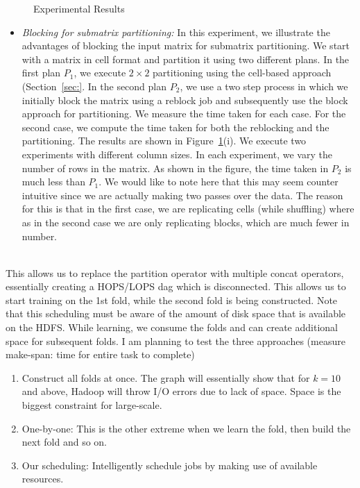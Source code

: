 \documentclass{vldb}
\newcommand{\topic}[1]{\par \smallskip \smallskip \noindent{\bf \uline{#1}}}
\begin{document}
{\begin{figure}
\begin{tabular}{ccc}
\end{tabular}

\caption{Experimental Results}
\label{fig:results}
\end{figure}

\topic{Optimization}

\begin{itemize}
\item {\em Blocking for submatrix partitioning:}
In this experiment, we illustrate the advantages of
blocking the input matrix for submatrix partitioning. We start with a matrix in
cell format and partition it using two different plans. In the first plan $P_1$, we
execute $2\times 2$ partitioning using the cell-based approach
(Section~\ref{sec:}. In the second plan $P_2$, we use a two step process in which we
initially block the matrix using a reblock job and subsequently use the
block approach for partitioning. We measure the time taken for each case. For
the second case, we compute the time taken for both the reblocking and the
partitioning. The results are shown in Figure~\ref{fig:results}(i). We execute
two experiments with different column sizes. In each experiment, we vary the
number of rows in the matrix.
As shown in the figure, the time taken in $P_2$ is much less than $P_1$. We
would like to note here that this may seem counter intuitive
since we are actually making two passes over the data. The reason for this is
that in the first case, we are replicating cells (while shuffling) where as in
the second case we are only replicating blocks, which are much fewer in number.
\end{itemize}


\topic{\em Scheduling:}\\ This allows us to replace the partition operator
with multiple concat operators, essentially creating a HOPS/LOPS dag which is
disconnected. This allows us to start training on the 1st fold, while the second
fold is being constructed. Note that this scheduling must be aware of the amount
of disk space that is available on the HDFS. While learning, we consume the
folds and can create additional space for subsequent folds. I am planning to
test the three approaches (measure make-span: time for entire task to complete)
\begin{enumerate}
\item Construct all folds at once. The graph will essentially show that for
$k=10$ and above, Hadoop will throw I/O errors due to lack of space. Space is
the biggest constraint for large-scale.
\item One-by-one: This is the other extreme when we learn the fold, then build
the next fold and so on.
\item Our scheduling: Intelligently schedule jobs by making use of available
resources.
\end{enumerate}
}
\end{document}

